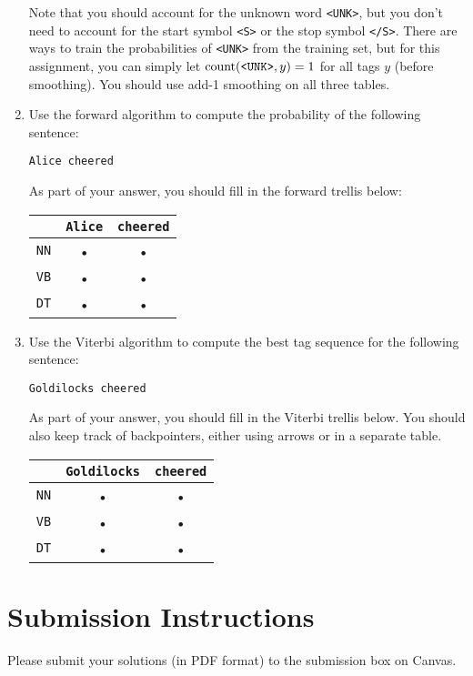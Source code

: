 \documentclass[11pt,letterpaper]{article}
\begin{document}
\begin{enumerate}
Note that you should account for the unknown word \texttt{<UNK>}, but you don't need to account for the start symbol \texttt{<S>} or the stop symbol \texttt{</S>}. There are ways to train the probabilities of \texttt{<UNK>} from the training set, but for this assignment, you can simply let $\textnormal{count}(\texttt{<UNK>},y)=1$ for all tags $y$ (before smoothing). You should use add-1 smoothing on all three tables.

\item Use the forward algorithm to compute the probability of the following sentence:

\texttt{Alice cheered}

As part of your answer, you should fill in the forward trellis below:
\begin{center}
\begin{tabular}{|c|c|c|}
\hline 
 & \texttt{Alice} & \texttt{cheered} \\ 
\hline 
\texttt{NN} & • & • \\ 
\hline 
\texttt{VB} & • & • \\ 
\hline 
\texttt{DT} & • & • \\ 
\hline 
\end{tabular} 
\end{center}

\item Use the Viterbi algorithm to compute the best tag sequence for the following sentence:

\texttt{Goldilocks cheered}

As part of your answer, you should fill in the Viterbi trellis below. You should also keep track of backpointers, either using arrows or in a separate table.
\begin{center}
\begin{tabular}{|c|c|c|}
\hline 
& \texttt{Goldilocks} & \texttt{cheered} \\ 
\hline 
\texttt{NN} & • & • \\ 
\hline 
\texttt{VB} & • & • \\ 
\hline 
\texttt{DT} & • & • \\ 
\hline 
\end{tabular} 
\end{center}

\end{enumerate}

\section*{Submission Instructions}

Please submit your solutions (in PDF format) to the submission box on Canvas.
\end{document}
